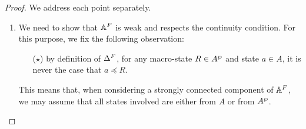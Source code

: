 \begin{proof} %
We address each point separately.
\begin{enumerate}
  \item We need to show that $\mathbb{A}^{F}$ is weak and respects the continuity condition. For this purpose, we fix the following observation:
      \begin{itemize}
      \item[($\star$)] by definition of $\Delta^{F}$, for any macro-state $R \in A^{\wp}$ and state $a \in A$, it is never the case that $a \preceq R$.
      \end{itemize}
      This means that, when considering a strongly connected component of $\mathbb{A}^{F}$, we may assume that all states involved are either from $A$ or from $A^{\wp}$.


\end{enumerate}
\end{proof}
